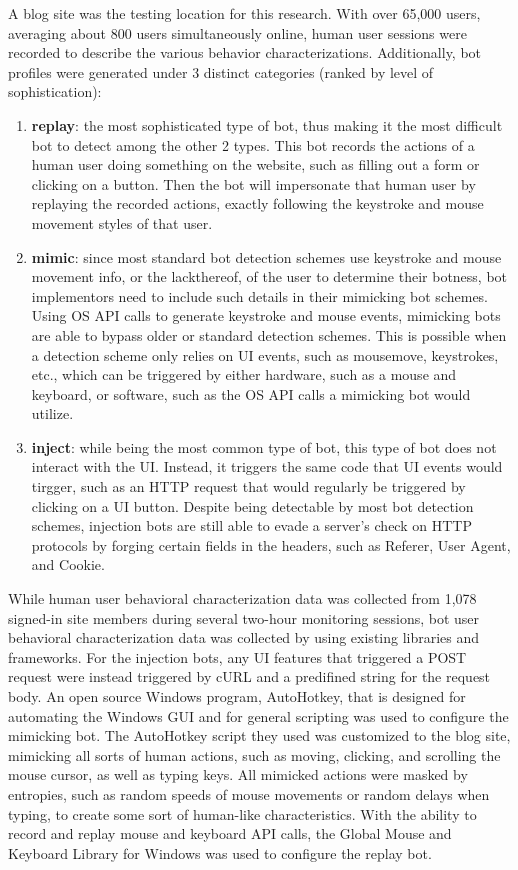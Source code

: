 A blog site was the testing location for this research.
With over 65,000 users, averaging about 800 users simultaneously online, human user sessions were recorded to describe the various behavior characterizations.
Additionally, bot profiles were generated under 3 distinct categories (ranked by level of sophistication):
\begin{enumerate}
    \item \textbf{replay}: the most sophisticated type of bot, thus making it the most difficult bot to detect among the other 2 types.
        This bot records the actions of a human user doing something on the website, such as filling out a form or clicking on a button.
        Then the bot will impersonate that human user by replaying the recorded actions, exactly following the keystroke and mouse movement styles of that user.
    \item \textbf{mimic}: since most standard bot detection schemes use keystroke and mouse movement info, or the lackthereof, of the user to determine their botness, bot implementors need to include such details in their mimicking bot schemes.
        Using OS API calls to generate keystroke and mouse events, mimicking bots are able to bypass older or standard detection schemes.
        This is possible when a detection scheme only relies on UI events, such as mousemove, keystrokes, etc., which can be triggered by either hardware, such as a mouse and keyboard, or software, such as the OS API calls a mimicking bot would utilize.
    \item \textbf{inject}: while being the most common type of bot, this type of bot does not interact with the UI. Instead, it triggers the same code that UI events would tirgger, such as an HTTP request that would regularly be triggered by clicking on a UI button.
        Despite being detectable by most bot detection schemes, injection bots are still able to evade a server's check on HTTP protocols by forging certain fields in the headers, such as Referer, User Agent, and Cookie.
\end{enumerate}
While human user behavioral characterization data was collected from 1,078 signed-in site members during several two-hour monitoring sessions, bot user behavioral characterization data was collected by using existing libraries and frameworks.
For the injection bots, any UI features that triggered a POST request were instead triggered by cURL and a predifined string for the request body.
An open source Windows program, AutoHotkey, that is designed for automating the Windows GUI and for general scripting was used to configure the mimicking bot.
The AutoHotkey script they used was customized to the blog site, mimicking all sorts of human actions, such as moving, clicking, and scrolling the mouse cursor, as well as typing keys.
All mimicked actions were masked by entropies, such as random speeds of mouse movements or random delays when typing, to create some sort of human-like characteristics.
With the ability to record and replay mouse and keyboard API calls, the Global Mouse and Keyboard Library for Windows was used to configure the replay bot.

